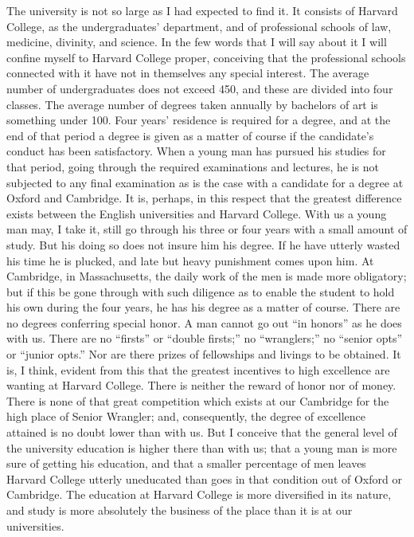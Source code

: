 The university is not so large as I had expected to find it.  It
consists of Harvard College, as the undergraduates' department, and
of professional schools of law, medicine, divinity, and science.
In the few words that I will say about it I will confine myself to
Harvard College proper, conceiving that the professional schools
connected with it have not in themselves any special interest.  The
average number of undergraduates does not exceed 450, and these are
divided into four classes.  The average number of degrees taken
annually by bachelors of art is something under 100.  Four years'
residence is required for a degree, and at the end of that period a
degree is given as a matter of course if the candidate's conduct
has been satisfactory.  When a young man has pursued his studies
for that period, going through the required examinations and
lectures, he is not subjected to any final examination as is the
case with a candidate for a degree at Oxford and Cambridge.  It is,
perhaps, in this respect that the greatest difference exists
between the English universities and Harvard College.  With us a
young man may, I take it, still go through his three or four years
with a small amount of study.  But his doing so does not insure him
his degree.  If he have utterly wasted his time he is plucked, and
late but heavy punishment comes upon him.  At Cambridge, in
Massachusetts, the daily work of the men is made more obligatory;
but if this be gone through with such diligence as to enable the
student to hold his own during the four years, he has his degree as
a matter of course.  There are no degrees conferring special honor.
A man cannot go out ``in honors'' as he does with us.  There are no
``firsts'' or ``double firsts;'' no ``wranglers;'' no ``senior opts'' or
``junior opts.''  Nor are there prizes of fellowships and livings to
be obtained.  It is, I think, evident from this that the greatest
incentives to high excellence are wanting at Harvard College.
There is neither the reward of honor nor of money.  There is none
of that great competition which exists at our Cambridge for the
high place of Senior Wrangler; and, consequently, the degree of
excellence attained is no doubt lower than with us.  But I conceive
that the general level of the university education is higher there
than with us; that a young man is more sure of getting his
education, and that a smaller percentage of men leaves Harvard
College utterly uneducated than goes in that condition out of
Oxford or Cambridge.  The education at Harvard College is more
diversified in its nature, and study is more absolutely the
business of the place than it is at our universities.

